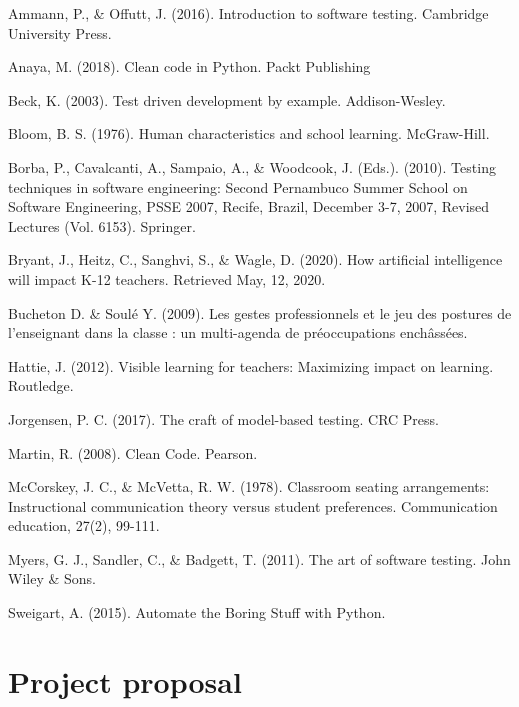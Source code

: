 \documentclass[10pt]{article}
\begin{document}
\begin{thebibliography}{Xyzz12}

 Ammann, P., \& Offutt, J. (2016). Introduction to software testing. Cambridge University Press.

 Anaya, M. (2018). Clean code in Python. Packt Publishing

 Beck, K. (2003). Test driven development by example. Addison-Wesley.

 Bloom, B. S. (1976). Human characteristics and school learning. McGraw-Hill.

 Borba, P., Cavalcanti, A., Sampaio, A., \& Woodcook, J. (Eds.). (2010). Testing techniques in software engineering: Second Pernambuco Summer School on Software Engineering, PSSE 2007, Recife, Brazil, December 3-7, 2007, Revised Lectures (Vol. 6153). Springer.

 Bryant, J., Heitz, C., Sanghvi, S., \& Wagle, D. (2020). How artificial intelligence will impact K-12 teachers. Retrieved May, 12, 2020.

 Bucheton D. \& Soulé Y. (2009). Les gestes professionnels et le jeu des postures de l’enseignant dans la classe : un multi-agenda de préoccupations enchâssées.

 Hattie, J. (2012). Visible learning for teachers: Maximizing impact on learning. Routledge.

 Jorgensen, P. C. (2017). The craft of model-based testing. CRC Press.

 Martin, R. (2008). Clean Code. Pearson.

 McCorskey, J. C., \& McVetta, R. W. (1978). Classroom seating arrangements: Instructional communication theory versus student preferences. Communication education, 27(2), 99-111.

 Myers, G. J., Sandler, C., \& Badgett, T. (2011). The art of software testing. John Wiley \& Sons.

 Sweigart, A. (2015). Automate the Boring Stuff with Python.
\end{thebibliography}

\appendix

\section{Project proposal}
\end{document}
